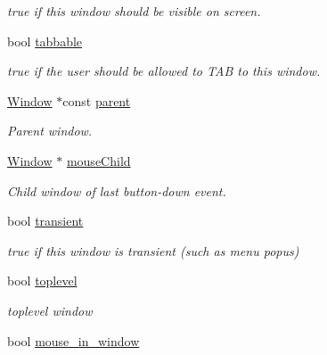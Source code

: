 \begin{DoxyCompactItemize}
\begin{DoxyCompactList}\small\item\em {\ttfamily true} if this window should be visible on screen. \end{DoxyCompactList}\item 
\hypertarget{classGUI_1_1Window_a0377219c50452c34ea1cd4e96d2574f8}{bool \hyperlink{classGUI_1_1Window_a0377219c50452c34ea1cd4e96d2574f8}{tabbable}}\label{classGUI_1_1Window_a0377219c50452c34ea1cd4e96d2574f8}

\begin{DoxyCompactList}\small\item\em {\ttfamily true} if the user should be allowed to T\-A\-B to this window. \end{DoxyCompactList}\item 
\hypertarget{classGUI_1_1Window_a2e593ff65e7702178d82fe9010a0b539}{\hyperlink{classGUI_1_1Window}{Window} $\ast$const \hyperlink{classGUI_1_1Window_a2e593ff65e7702178d82fe9010a0b539}{parent}}\label{classGUI_1_1Window_a2e593ff65e7702178d82fe9010a0b539}

\begin{DoxyCompactList}\small\item\em Parent window. \end{DoxyCompactList}\item 
\hyperlink{classGUI_1_1Window}{Window} $\ast$ \hyperlink{classGUI_1_1Window_addd401dab430594e678366e7ff73ef2d}{mouse\-Child}
\begin{DoxyCompactList}\small\item\em Child window of last button-\/down event. \end{DoxyCompactList}\item 
\hypertarget{classGUI_1_1Window_a5bfe42b831d9d036ac85062e97eb99f0}{bool \hyperlink{classGUI_1_1Window_a5bfe42b831d9d036ac85062e97eb99f0}{transient}}\label{classGUI_1_1Window_a5bfe42b831d9d036ac85062e97eb99f0}

\begin{DoxyCompactList}\small\item\em {\ttfamily true} if this window is transient (such as menu popus) \end{DoxyCompactList}\item 
\hypertarget{classGUI_1_1Window_a3bccd3f871c42d8905b316a272399a6e}{bool \hyperlink{classGUI_1_1Window_a3bccd3f871c42d8905b316a272399a6e}{toplevel}}\label{classGUI_1_1Window_a3bccd3f871c42d8905b316a272399a6e}

\begin{DoxyCompactList}\small\item\em {\ttfamily toplevel} window \end{DoxyCompactList}\item 
\hypertarget{classGUI_1_1Window_a785347b0afa1f9ce56e004e5941f0ebe}{bool \hyperlink{classGUI_1_1Window_a785347b0afa1f9ce56e004e5941f0ebe}{mouse\-\_\-in\-\_\-window}}\label{classGUI_1_1Window_a785347b0afa1f9ce56e004e5941f0ebe}


\end{DoxyCompactItemize}
